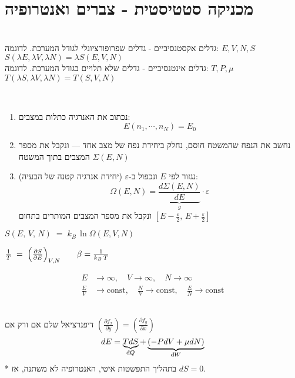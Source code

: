 \section{מכניקה סטטיסטית - צברים ואנטרופיה}
\begin{cheatformula} \\
    גדלים אקסטנסיביים - גדלים שפרופורציונלי לגודל המערכת. לדוגמה:
    $E,V,N,S$ \\
    $S(\lambda E,\lambda V,\lambda N) = \lambda S(E,V,N)$ \\
    גדלים אינטנסיביים - גדלים שלא תלויים בגודל המערכת. לדוגמה:
    $T,P,\mu$ \\
    $T(\lambda S, \lambda V, \lambda N) = T(S, V, N)$
\end{cheatformula}

\begin{cheatformula}\\
\begin{flushright}
\begin{enumerate}
    \item נכתוב את האנרגיה כתלות במצבים: 
    $$E(n_{1},\cdots,n_{N}) = E_{0}$$
    \item נחשב את הנפח שהמשטח חוסם, נחלק ביחידת נפח של מצב אחד — ונקבל את מספר המצבים בתוך המשטח
    $\Sigma(E, N)$
    \item נגזור לפי $E$ ונכפול ב-$\varepsilon$ (יחידת אנרגיה קטנה של הבעיה):
    $$\Omega(E,N) = \underset{g}{\underbrace{\frac{d\Sigma(E, N)}{dE}}}  \cdot \varepsilon$$    
    ונקבל את מספר המצבים המותרים בתחום 
    $\left[E - \frac{\varepsilon}{2},\, E + \frac{\varepsilon}{2} \right]$
    
\end{enumerate}
\end{flushright}

\begin{cheatformula}[אנטרופיה]
    $S(E,\,V,\,N) \;=\; k_{B}\,\ln \Omega(E,V,N)$
\end{cheatformula}
\end{cheatformula}
\begin{cheatformula}[טמפרטורה]
     $
        \frac{1}{T} \;=\; \Bigl(\tfrac{\partial S}{\partial E}\Bigr)_{V,N} \qquad
        \beta = \frac{1}{k_{B}\,T}
    $
\end{cheatformula}

\begin{cheatformula}
    \begin{align*}
E &\to \infty, \quad V \to \infty, \quad N \to \infty \\
\frac{E}{V} &\to \text{const}, \quad \frac{N}{V} \to \text{const}, \quad \frac{E}{N} \to \text{const}
\end{align*}
\end{cheatformula}

\begin{cheatformula}[דיפרנציאלים]\\
דיפנרציאל שלם אם ורק אם
$ \left( \frac{\partial f_x}{\partial y} \right) = \left( \frac{\partial f_y}{\partial x} \right)$
\[
dE = \underbrace{TdS}_{\mathrm{d}\hspace*{-0.1405em}\bar{}\hspace*{0.1em} Q} + \underbrace{(-PdV + \mu dN)}_{\mathrm{d}\hspace*{-0.1405em}\bar{}\hspace*{0.1em} W}
\]
* בתהליך התפשטות איטי, האנטרופיה לא משתנה, אז $dS = 0$.
\end{cheatformula}
